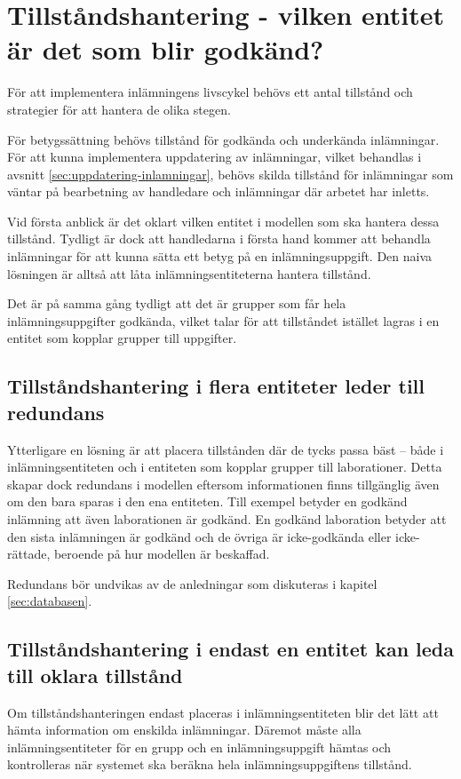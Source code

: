 \section{Tillståndshantering - vilken entitet är det som blir godkänd?}

För att implementera inlämningens livscykel behövs ett antal tillstånd och strategier för att hantera de olika stegen.

För betygssättning behövs tillstånd för godkända och underkända inlämningar. För att kunna implementera uppdatering av inlämningar, vilket behandlas i avsnitt \ref{sec:uppdatering-inlamningar}, behövs skilda tillstånd för inlämningar som väntar på bearbetning av handledare och inlämningar där arbetet har inletts.

Vid första anblick är det oklart vilken entitet i modellen som ska hantera dessa tillstånd. Tydligt är dock att handledarna i första hand kommer att behandla inlämningar för att kunna sätta ett betyg på en inlämningsuppgift. Den naiva lösningen är alltså att låta inlämningsentiteterna hantera tillstånd.

Det är på samma gång tydligt att det är grupper som får hela inlämningsuppgifter godkända, vilket talar för att tillståndet istället lagras i en entitet som kopplar grupper till uppgifter.

\subsection{Tillståndshantering i flera entiteter leder till redundans}
Ytterligare en lösning är att placera tillstånden där de tycks passa bäst – både i inlämningsentiteten och i entiteten som kopplar grupper till laborationer. Detta skapar dock redundans i modellen eftersom informationen finns tillgänglig även om den bara sparas i den ena entiteten. Till exempel betyder en godkänd inlämning att även laborationen är godkänd. En godkänd laboration betyder att den sista inlämningen är godkänd och de övriga är icke-godkända eller icke-rättade, beroende på hur modellen är beskaffad.

Redundans bör undvikas av de anledningar som diskuteras i kapitel \ref{sec:databasen}.

\subsection{Tillståndshantering i endast en entitet kan leda till oklara tillstånd}
Om tillståndshanteringen endast placeras i inlämningsentiteten blir det lätt att hämta information om enskilda inlämningar. Däremot måste alla inlämningsentiteter för en grupp och en inlämningsuppgift hämtas och kontrolleras när systemet ska beräkna hela inlämningsuppgiftens tillstånd.


